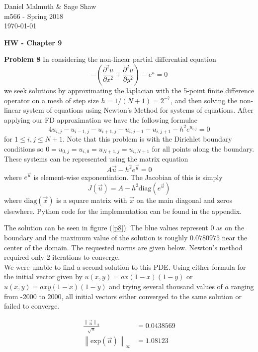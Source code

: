 \documentclass[12pt]{article}
\newcommand{\problem}[1]{\hspace{-4 ex} \large \textbf{Problem #1} }
\newcommand{\norm}[1]{\left\lVert#1\right\rVert}
\begin{document}
	\thispagestyle{empty}
	
	\begin{flushright}
		Daniel Malmuth \& Sage Shaw \\
		m566 - Spring 2018 \\
		\today
	\end{flushright}
	
{\large \textbf{HW - Chapter 9}}\bigbreak

\problem{8} In considering the non-linear partial differential equation
$$
-\left( \frac{\partial^2 u }{\partial x^2} + \frac{\partial^2 u }{\partial y^2} \right) - e^u = 0
$$
we seek solutions by approximating the laplacian with the 5-point finite difference operator on a mesh of step size $h=1/(N+1)=2^{-7}$, and then solving the non-linear system of equations using Newton's Method for systems of equations. After applying our FD approximation we have the following formulae
$$
4u_{i,j} - u_{i-1,j} - u_{i+1,j} - u_{i,j-1} - u_{i,j+1} - h^2e^{u_{i,j}} = 0
$$
for $1 \leq i,j \leq N+1$. Note that this problem is with the Dirichlet boundary conditions so $0 = u_{0,j} = u_{i,0} =  u_{N+1,j} = u_{i,N+1}$ for all points along the boundary. These systems can be represented using the matrix equation
$$
A\vec{u} - h^2e^{\vec{u}} = 0
$$
where $e^{\vec{u}}$ is element-wise exponentiation. The Jacobian of this is simply
$$
J(\vec{u}) = A - h^2 \text{diag}(e^{\vec{u}})
$$
where $\text{diag}(\vec{x})$ is a square matrix with $\vec{x}$ on the main diagonal and zeros elsewhere. Python code for the implementation can be found in the appendix. \bigbreak

The solution can be seen in figure (\ref{p8}). The blue values represent $0$ as on the boundary and the maximum value of the solution is roughly $0.0780975$ near the center of the domain. The requested norms are given below. Newton's method required only 2 iterations to converge. \\

We were unable to find a second solution to this PDE. Using either formula for the initial vector given by $u(x,y) = ax(1-x)(1-y)$ or $u(x,y) = axy(1-x)(1-y)$ and trying several thousand values of $a$ ranging from -2000 to 2000, all initial vectors either converged to the same solution or failed to converge.

\begin{align*}
\frac{\norm{\vec{u}}_2}{\sqrt{n}} &= 0.0438569 \\
\norm{\text{exp}(\vec{u})}_\infty &= 1.08123
\end{align*}
\end{document}
